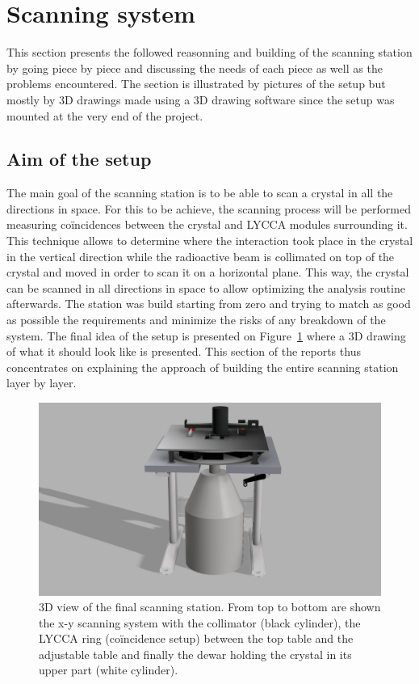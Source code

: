 \documentclass[11pt,a4paper]{article}
\begin{document}
\newpage

\section{Scanning system} \label{scansystem}

This section presents the followed reasonning and building of the scanning station by going piece by piece and discussing the needs of each piece as well as the problems encountered. The section is illustrated by pictures of the setup but mostly by 3D drawings made using a 3D drawing software since the setup was mounted at the very end of the project.

\subsection{Aim of the setup}

The main goal of the scanning station is to be able to scan a crystal in all the directions in space. For this to be achieve, the scanning process will be performed measuring coïncidences between the crystal and LYCCA \cite{LYCCA} modules surrounding it. This technique allows to determine where the interaction took place in the crystal in the vertical direction while the radioactive beam is collimated on top of the crystal and moved in order to scan it on a horizontal plane. This way, the crystal can be scanned in all directions in space to allow optimizing the analysis routine afterwards. The station was build starting from zero and trying to match as good as possible the requirements and minimize the risks of any breakdown of the system. The final idea of the setup is presented on Figure~\ref{3D_total} where a 3D drawing of what it should look like is presented. This section of the reports thus concentrates on explaining the approach of building the entire scanning station layer by layer.

\begin{figure}[!h]
\centering
\includegraphics[scale=0.2]{final_setup.png}
\caption{3D view of the final scanning station. From top to bottom are shown the x-y scanning system with the collimator (black cylinder), the LYCCA ring (coïncidence setup) between the top table and the adjustable table and finally the dewar holding the crystal in its upper part (white cylinder).}
\label{3D_total}
\end{figure}
\end{document}
